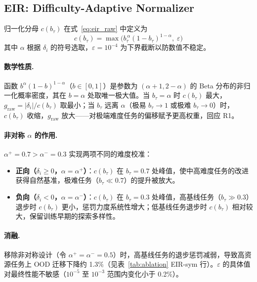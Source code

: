 \documentclass[11pt]{article}
\begin{document}
\FloatBarrier

\subsection{EIR: Difficulty-Adaptive Normalizer}
\label{app:eir_normalizer}

归一化分母 $c(b_\tau)$ 在式~\eqref{eq:eir_raw} 中定义为
\begin{equation}
  c(b_\tau) = \max\!\bigl(b_\tau^{\,\alpha}(1-b_\tau)^{1-\alpha},\; \varepsilon\bigr)
  \label{eq:c_btau}
\end{equation}
其中 $\alpha$ 根据 $\delta_i$ 的符号选取，$\varepsilon = 10^{-4}$ 为下界截断以防数值不稳定。

\paragraph{数学性质.}
函数 $b^\alpha(1-b)^{1-\alpha}$（$b \in [0,1]$）是参数为 $(\alpha+1, 2-\alpha)$ 的 Beta 分布的非归一化概率密度，其在 $b = \alpha$ 处取唯一极大值。当 $b_\tau = \alpha$ 时 $c(b_\tau)$ 最大，$g_\text{raw} = |\delta_i|/c(b_\tau)$ 取最小；当 $b_\tau$ 远离 $\alpha$（极易 $b_\tau \to 1$ 或极难 $b_\tau \to 0$）时，$c(b_\tau)$ 收缩，$g_\text{raw}$ 放大——对极端难度任务的偏移赋予更高权重，回应 R1。

\paragraph{非对称 $\alpha$ 的作用.}
$\alpha^+ = 0.7 > \alpha^- = 0.3$ 实现两项不同的难度校准：
\begin{itemize}[leftmargin=*, nosep]
  \item \textbf{正向（$\delta_i \geq 0$，$\alpha = \alpha^+$）}：$c(b_\tau)$ 在 $b_\tau = 0.7$ 处峰值，使中高难度任务的改进获得自然基准，极难任务（$b_\tau \ll 0.7$）的提升被放大。
  \item \textbf{负向（$\delta_i < 0$，$\alpha = \alpha^-$）}：$c(b_\tau)$ 在 $b_\tau = 0.3$ 处峰值，高基线任务（$b_\tau \gg 0.3$）退步时 $c(b_\tau)$ 更小，惩罚力度系统性增大；低基线任务退步时 $c(b_\tau)$ 相对较大，保留训练早期的探索多样性。
\end{itemize}

\paragraph{消融.}
移除非对称设计（令 $\alpha^+ = \alpha^- = 0.5$）时，高基线任务的退步惩罚减弱，导致高资源任务上 OOD 迁移下降约 1.3\%（见表~\ref{tab:ablation} EIR-sym 行）。$\varepsilon$ 的具体值对最终性能不敏感（$10^{-5}$ 至 $10^{-3}$ 范围内变化小于 0.2\%）。
\end{document}
